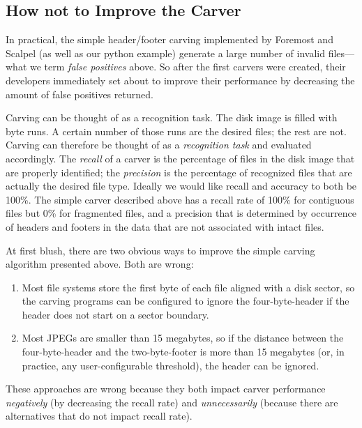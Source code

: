 \documentclass[11pt,letter]{article}
\begin{document}
\subsection{How not to Improve the Carver}
In practical, the simple header/footer carving implemented by Foremost
and Scalpel (as well as our python example) generate a large number of
invalid files---what we term \emph{false positives} above. So after
the first carvers were created, their developers immediately set about
to improve their performance by decreasing the amount of false
positives returned.

Carving can be thought of as a recognition task. The disk image is
filled with byte runs. A certain number of those runs are the desired
files; the rest are not. Carving can therefore be thought of as a
\emph{recognition task} and evaluated accordingly. The \emph{recall}
of a carver is the percentage of files in the disk image that are
properly identified; the \emph{precision}  is the percentage of
recognized files that are actually the desired file type. Ideally we
would like recall and accuracy to both be 100\%. The simple carver
described above has a recall rate of 100\% for contiguous files but
0\% for fragmented files, and a precision that is determined by
occurrence of headers and footers in the data that are not associated
with intact files.

At first blush, there are two obvious ways to improve the simple carving
algorithm presented above. Both are wrong:

\begin{enumerate}
\item Most file systems store the first byte of
each file aligned with a disk sector, so the carving programs can be
configured to ignore the four-byte-header if the header does not start on a
sector boundary.

\item Most JPEGs are smaller than 15 megabytes, so if the
distance between the four-byte-header and the two-byte-footer is more
than 15 megabytes (or, in practice, any user-configurable threshold),
the header can be ignored. 

\end{enumerate}

These approaches are wrong because they both impact carver
performance \emph{negatively} (by decreasing the recall rate) and
\emph{unnecessarily} (because there are alternatives that do not impact
recall rate).
\end{document}

